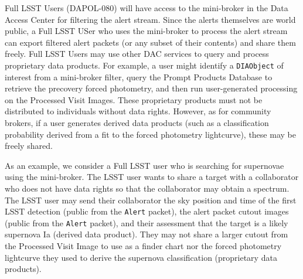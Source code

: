 

Full LSST Users (DAPOL-080) will have access to the mini-broker in the Data Access Center for filtering the alert stream.
Since the alerts themselves are world public, a Full LSST USer who uses the mini-broker to process the alert stream can export filtered alert packets (or any subset of their contents) and share them freely.
Full LSST Users may use other DAC services to query and process proprietary data products. 
For example, a user might identify a \texttt{DIAObject} of interest from a mini-broker filter, query the Prompt Products Database to retrieve the precovery forced photometry, and then run user-generated processing on the Processed Visit Images.
These proprietary products must not be distributed to individuals without data rights.
However, as for community brokers, if a user generates derived data products (such as a classification probability derived from a fit to the forced photometry lightcurve), these may be freely shared.

As an example, we consider a Full LSST user who is searching for supernovae using the mini-broker.
The LSST user wants to share a target with a collaborator who does not have data rights so that the collaborator may obtain a spectrum.
The LSST user may send their collaborator the sky position and time of the first LSST detection (public from the \texttt{Alert} packet), the alert packet cutout images (public from the \texttt{Alert} packet), and their assessment that the target is a likely supernova Ia (derived data product).
They may not share a larger cutout from the Processed Visit Image to use as a finder chart nor the forced photometry lightcurve they used to derive the supernova classification (proprietary data products).
